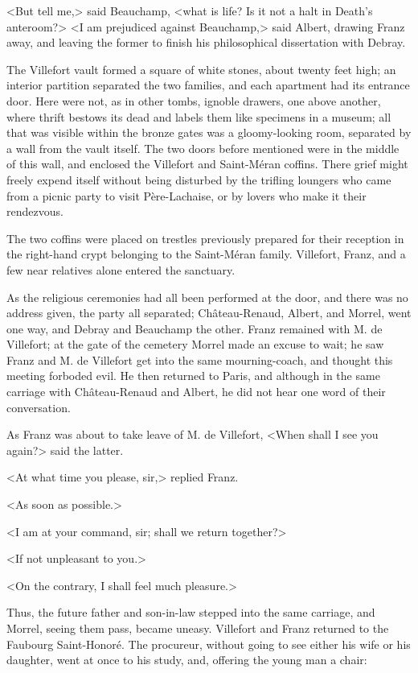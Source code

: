  <But tell me,> said Beauchamp, <what is life? Is it not a halt in Death's anteroom?>  <I am prejudiced against Beauchamp,> said Albert, drawing Franz away, and leaving the former to finish his philosophical dissertation with Debray. 

 The Villefort vault formed a square of white stones, about twenty feet high; an interior partition separated the two families, and each apartment had its entrance door. Here were not, as in other tombs, ignoble drawers, one above another, where thrift bestows its dead and labels them like specimens in a museum; all that was visible within the bronze gates was a gloomy-looking room, separated by a wall from the vault itself. The two doors before mentioned were in the middle of this wall, and enclosed the Villefort and Saint-Méran coffins. There grief might freely expend itself without being disturbed by the trifling loungers who came from a picnic party to visit Père-Lachaise, or by lovers who make it their rendezvous. 

 The two coffins were placed on trestles previously prepared for their reception in the right-hand crypt belonging to the Saint-Méran family. Villefort, Franz, and a few near relatives alone entered the sanctuary. 

 As the religious ceremonies had all been performed at the door, and there was no address given, the party all separated; Château-Renaud, Albert, and Morrel, went one way, and Debray and Beauchamp the other. Franz remained with M. de Villefort; at the gate of the cemetery Morrel made an excuse to wait; he saw Franz and M. de Villefort get into the same mourning-coach, and thought this meeting forboded evil. He then returned to Paris, and although in the same carriage with Château-Renaud and Albert, he did not hear one word of their conversation. 

 As Franz was about to take leave of M. de Villefort, <When shall I see you again?> said the latter. 

 <At what time you please, sir,> replied Franz. 

 <As soon as possible.> 

 <I am at your command, sir; shall we return together?> 

 <If not unpleasant to you.> 

 <On the contrary, I shall feel much pleasure.> 

 Thus, the future father and son-in-law stepped into the same carriage, and Morrel, seeing them pass, became uneasy. Villefort and Franz returned to the Faubourg Saint-Honoré. The procureur, without going to see either his wife or his daughter, went at once to his study, and, offering the young man a chair: 

